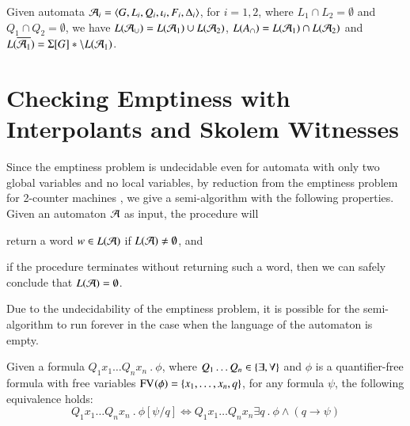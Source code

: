 \documentclass{llncs}
\begin{document}
\begin{lemma}\label{lemma:boolean-closure}
  Given automata $\mathcal{A}_i = \langle G,L_i,Q_i,\iota_i,F_i,\Delta_i \rangle$, for
  $i=1,2$, where $L_1 \cap L_2 = \emptyset$ and $Q_1 \cap Q_2 =
  \emptyset$, we have $L(\mathcal{A}_\cup) = L(\mathcal{A}_1) \cup L(\mathcal{A}_2)$, $L(A_\cap)
  = L(\mathcal{A}_1) \cap L(\mathcal{A}_2)$ and $L(\overline{\mathcal{A}_1}) = \Sigma[G]*
  \setminus L(\mathcal{A}_1)$. 
\end{lemma}

\section{Checking Emptiness with Interpolants and Skolem Witnesses}

Since the emptiness problem is undecidable even for automata with only
two global variables and no local variables, by reduction from the
emptiness problem for 2-counter machines \cite{Minsky67}, we give a
semi-algorithm with the following properties. Given an automaton $\mathcal{A}$
as input, the procedure will\begin{inparaenum}[(1)] 
\item return a word $w \in L(\mathcal{A})$ if $L(\mathcal{A})
\neq \emptyset$, and 
%
\item if the procedure terminates without returning such a word, then
  we can safely conclude that $L(\mathcal{A}) = \emptyset$. \end{inparaenum}
Due to the undecidability of the emptiness problem, it is possible for
the semi-algorithm to run forever in the case when the language of the
automaton is empty.

\begin{proposition}\label{prop:substitution}
  Given a formula $Q_1 x_1 \ldots Q_n x_n ~.~ \phi$, where $Q_1 \ldots
  Q_n \in \{ \exists,\forall \}$ and $\phi$ is a quantifier-free
  formula with free variables $\mathrm{FV}_{}(\phi) = \{ x_1,\ldots,x_n,q \}$,
  for any formula $\psi$, the following equivalence holds:
  \[Q_1 x_1 \ldots Q_n x_n ~.~ \phi[\psi/q] \iff 
  Q_1 x_1 \ldots Q_n x_n \exists q ~.~ \phi \wedge (q \rightarrow \psi)\]
\end{proposition}
\proof{
  
\qed}

 

\end{document}
